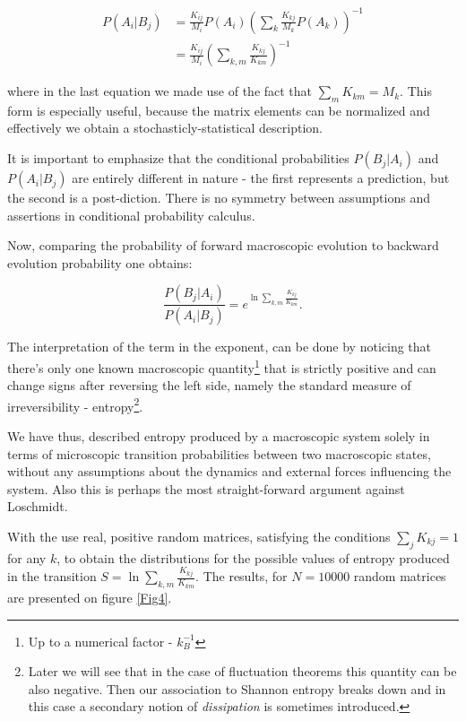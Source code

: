 \documentclass[a4paper,12pt]{article}
\begin{document}
\begin{equation}
\begin{aligned}
  P(A_i|B_j) &= \frac{K_{ij}}{M_i} P(A_i) ( \sum_k \frac{K_{kj}}{M_k}P(A_k) )^{-1}\\
  &= \frac{K_{ij}}{M_i} ( \sum_{k,m} \frac{K_{kj}}{K_{km}})^{-1}
\end{aligned}
\end{equation}

where in the last equation we made use of the fact that $\sum_m K_{km}=M_k $.
This form is especially useful, because the matrix elements can be normalized and effectively we obtain a stochasticly-statistical description.

It is important to emphasize that the conditional probabilities $P(B_j|A_i)$ and $P(A_i|B_j)$ are entirely different in nature - the first represents a prediction, but the second is a post-diction. There is no symmetry between assumptions and assertions in conditional probability calculus.

Now, comparing the probability of forward macroscopic evolution to backward evolution probability one obtains: 

\begin{equation}
  \frac{P(B_j|A_i)}{P(A_i|B_j)}= e^{\ln{\sum_{k,m} \frac{K_{kj}}{K_{km}}}}.
\end{equation}


The interpretation of the term in the exponent, can be done by noticing that there's only one known macroscopic quantity\footnote{Up to a numerical factor - $k_B^{-1}$} that is strictly positive and can change signs after reversing the left side, namely the standard measure of irreversibility - entropy\footnote{Later we will see that in the case of fluctuation theorems this quantity can be also negative. Then our association to Shannon entropy breaks down and in this case a secondary notion of \textit{dissipation} is sometimes introduced.}.

We have thus, described entropy produced by a macroscopic system solely in terms of microscopic transition probabilities between two macroscopic states, without any assumptions about the dynamics and external forces influencing the system. Also this is perhaps the most straight-forward argument against Loschmidt.

With the use real, positive random matrices, satisfying the conditions $\sum_j K_{kj} = 1$ for any $k$, to obtain the distributions for the possible values of entropy produced in the transition $ S = \ln{\sum_{k,m} \frac{K_{kj}}{K_{km}}} $. The results, for $N=10000$ random matrices are presented on figure \ref{Fig4}.
\end{document}

